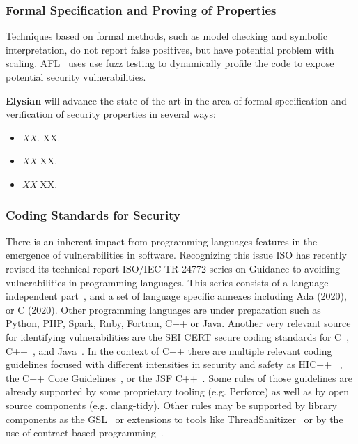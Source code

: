\documentclass[a4paper,11pt]{article}
\newcommand{\project}[1]{\textbf{#1}\xspace}
\newcommand{\SECURITY}{\project{Elysian}}
\newcommand{\TheProject}{\SECURITY}
\begin{document}
\subsubsection{Formal Specification and Proving of Properties}
\label{sect:formal}


Techniques based on formal methods, such as model checking and symbolic interpretation, do not report false  positives, but have potential problem with scaling. AFL~\cite{AFL} uses use fuzz testing to dynamically profile the code to expose potential security vulnerabilities.

\begin{mdframed}[backgroundcolor=gray!10]
\TheProject{} will advance the state of the art in the area of formal specification and verification of security properties in several ways:
\begin{itemize}
\item \emph{XX.} XX.
\item \emph{XX} XX.
\item \emph{XX} XX.
\end{itemize}
\end{mdframed}

\subsubsection{Coding Standards for Security}
\label{sect:codingStandards}

There is an inherent impact from programming languages features in the
emergence of vulnerabilities in software. Recognizing this issue ISO has
recently revised its technical report ISO/IEC  TR 24772 series on Guidance to
avoiding vulnerabilities in programming languages. This series consists of a
language independent part~\cite{iso24772:1}, and a set of language specific
annexes including Ada (2020), or C (2020). Other programming languages are
under preparation such as Python, PHP, Spark, Ruby, Fortran, C++ or Java.
Another very relevant source for identifying vulnerabilities are the SEI CERT
secure coding standards for C~\cite{cert:c}, C++~\cite{cert:cpp}, and
Java~\cite{cert:java}. In the context of C++ there are multiple relevant coding
guidelines focused with different intensities in security and safety as
HIC++~\cite{hicpp} , the C++ Core Guidelines~\cite{cpp:core-guidelines}, or the
JSF C++~\cite{cpp:jsf}. Some rules of those guidelines are already supported by
some proprietary tooling (e.g.  Perforce) as well as by open source components
(e.g.  clang-tidy).  Other rules may be supported by library components as the
GSL~\cite{cpp:gsl} or extensions to tools like ThreadSanitizer~\cite{dolz:2017}
or by the use of contract based programming~\cite{lopez-gomez:2019}.
\end{document}
